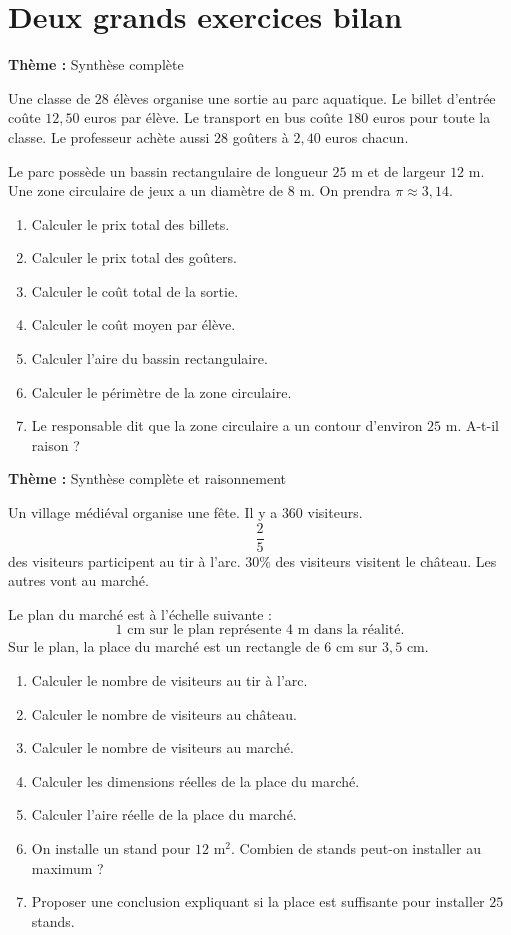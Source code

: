 \documentclass[11pt,a4paper]{article}
\newcounter{exo}
\newenvironment{exercice}[3]{
\refstepcounter{exo}
\begin{tcolorbox}[
colframe=bleuprepa,
colback=grisclair,
title={Exercice \theexo{} -- #1 \hfill #2}
]
\textbf{Thème :} #3

\medskip
}{
\end{tcolorbox}
}
\newcommand{\diffD}{$\bigstar\ \bigstar\ \bigstar\ \bigstar\ \star$}
\newcommand{\diffE}{$\bigstar\ \bigstar\ \bigstar\ \bigstar\ \bigstar$}
\begin{document}
\section{Deux grands exercices bilan}

\begin{exercice}{Bilan 1 -- La sortie au parc aquatique}{\diffD}{Synthèse complète}
Une classe de $28$ élèves organise une sortie au parc aquatique.
Le billet d'entrée coûte $12,50$ euros par élève.
Le transport en bus coûte $180$ euros pour toute la classe.
Le professeur achète aussi $28$ goûters à $2,40$ euros chacun.

Le parc possède un bassin rectangulaire de longueur $25$ m et de largeur $12$ m.
Une zone circulaire de jeux a un diamètre de $8$ m.
On prendra $\pi\approx 3,14$.
\begin{enumerate}[label=\arabic*)]
\item Calculer le prix total des billets.
\item Calculer le prix total des goûters.
\item Calculer le coût total de la sortie.
\item Calculer le coût moyen par élève.
\item Calculer l'aire du bassin rectangulaire.
\item Calculer le périmètre de la zone circulaire.
\item Le responsable dit que la zone circulaire a un contour d'environ $25$ m. A-t-il raison ?
\end{enumerate}
\end{exercice}

\begin{exercice}{Bilan 2 -- Le village médiéval}{\diffE}{Synthèse complète et raisonnement}
Un village médiéval organise une fête.
Il y a $360$ visiteurs.
\[
\frac{2}{5}
\]
des visiteurs participent au tir à l'arc.
$30\%$ des visiteurs visitent le château.
Les autres vont au marché.

Le plan du marché est à l'échelle suivante :
\[
1\text{ cm sur le plan représente }4\text{ m dans la réalité}.
\]
Sur le plan, la place du marché est un rectangle de $6$ cm sur $3,5$ cm.
\begin{enumerate}[label=\arabic*)]
\item Calculer le nombre de visiteurs au tir à l'arc.
\item Calculer le nombre de visiteurs au château.
\item Calculer le nombre de visiteurs au marché.
\item Calculer les dimensions réelles de la place du marché.
\item Calculer l'aire réelle de la place du marché.
\item On installe un stand pour $12$ m$^2$. Combien de stands peut-on installer au maximum ?
\item Proposer une conclusion expliquant si la place est suffisante pour installer $25$ stands.
\end{enumerate}
\end{exercice}
\end{document}
